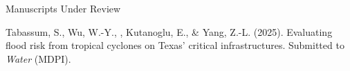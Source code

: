 \begin{rSection}{Manuscripts Under Review}
\begin{pubs}
    \item Tabassum, S., Wu, W.-Y., \me, Kutanoglu, E., \& Yang, Z.-L. (2025). Evaluating flood risk from tropical cyclones on Texas' critical infrastructures. Submitted to \textit{Water} (MDPI).
\end{pubs}
\end{rSection}
